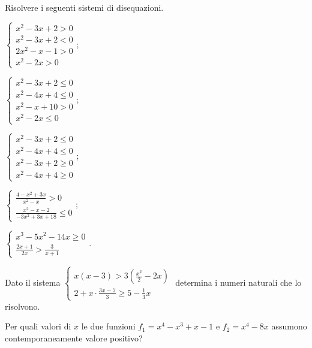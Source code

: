 \pagebreak
\begin{esercizio}[\Ast]
 \label{ese:4.79}
Risolvere i seguenti sistemi di disequazioni.
\begin{multicols}{2}
\begin{enumeratea}
\item $\left\{\begin{array}{l}x^2-3x+2>0\\x^2-3x+2<0\\2x^2-x-1>0\\x^2-2x>0 \end{array}\right.$;
\item $\left\{\begin{array}{l}x^2-3x+2\le 0\\x^2-4x+4\le 0\\x^2-x+10>0\\x^2-2x\le 0 \end{array}\right.$;
\item $\left\{\begin{array}{l}x^2-3x+2\le 0\\x^2-4x+4\le 0\\x^2-3x+2\ge 0\\x^2-4x+4\ge 0\end{array}\right.$;
\item $\left\{\begin{array}{l}{\frac{4-x^2+3x}{x^2-x}>0}\\{\frac{x^2-x-2}{-3x^2+3x+18}\le 0}\end{array}\right.$;
\item $\left\{\begin{array}{l}x^3-5x^2-14x\ge 0\\ \frac{2x+1}{2x}>\frac 3{x+1}\end{array}\right.$.
\end{enumeratea}
\end{multicols}
\end{esercizio}

\begin{esercizio}[\Ast]
\label{ese:4.80}
Dato il sistema $\left\{\begin{array}{l}{x(x-3)>3\left(\frac{x^2} 2-2x\right)}\\{2+x\cdot \frac{3x-7} 3\ge 5-\frac 1 3x}\end{array}\right.$ determina i numeri naturali che lo risolvono.
\end{esercizio}

\begin{esercizio}[\Ast]
 \label{ese:4.81}
Per quali valori di $ x $ le due funzioni $f_1=x^4-x^3+x-1$ e $f_2=x^4-8x$ assumono contemporaneamente valore positivo?
\end{esercizio}


